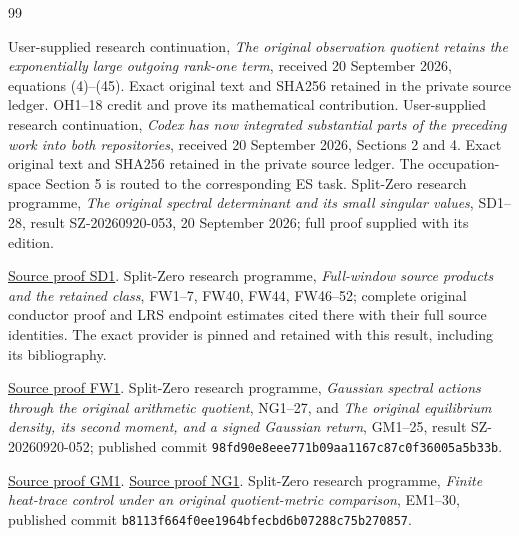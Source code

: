 \documentclass[11pt]{article}
\begin{document}
\clearpage
\begin{thebibliography}{99}

 User-supplied research continuation,
\emph{The original observation quotient retains the exponentially large
outgoing rank-one term}, received 20 September 2026, equations (4)--(45).
Exact original text and SHA256 retained in the private source ledger.
OH1--18 credit and prove its mathematical contribution.
 User-supplied research continuation,
\emph{Codex has now integrated substantial parts of the preceding work
into both repositories}, received 20 September 2026, Sections 2 and 4.
Exact original text and SHA256 retained in the private source ledger.
The occupation-space Section 5 is routed to the corresponding ES task.
 Split-Zero research programme, \emph{The original spectral
determinant and its small singular values}, SD1--28, result
SZ-20260920-053, 20 September 2026; full proof supplied with its edition.

\href{https://github.com/KokunoYumeto/zeta-function-research-reader/blob/5992ad50c0f2a06921f1fcaded7b4e38097c0739/workbenches/splitzero-tandem/continuations/20260920-original-kernel-mixed-determinants/providers/ORIGINAL_SPECTRAL_DETERMINANT.tex\#L34}{Source proof SD1}.
 Split-Zero research programme, \emph{Full-window source
products and the retained class}, FW1--7, FW40, FW44, FW46--52;
complete original conductor proof and LRS endpoint estimates cited
there with their full source identities. The exact provider is pinned
and retained with this result, including its bibliography.

\href{https://github.com/KokunoYumeto/zeta-function-research-reader/blob/5992ad50c0f2a06921f1fcaded7b4e38097c0739/workbenches/splitzero-tandem/continuations/20260920-original-kernel-mixed-determinants/providers/FULL_WINDOW_SOURCE_PRODUCTS.tex\#L28}{Source proof FW1}.
 Split-Zero research programme, \emph{Gaussian spectral
actions through the original arithmetic quotient}, NG1--27, and
\emph{The original equilibrium density, its second moment, and a signed
Gaussian return}, GM1--25, result SZ-20260920-052; published commit
\nolinkurl{98fd90e8eee771b09aa1167c87c0f36005a5b33b}.

\href{https://github.com/KokunoYumeto/zeta-function-research-reader/blob/5992ad50c0f2a06921f1fcaded7b4e38097c0739/workbenches/splitzero-tandem/continuations/20260920-original-kernel-mixed-determinants/providers/GAUSSIAN_EQUILIBRIUM_MOMENTS.tex\#L22}{Source proof GM1}. \href{https://github.com/KokunoYumeto/zeta-function-research-reader/blob/5992ad50c0f2a06921f1fcaded7b4e38097c0739/workbenches/splitzero-tandem/continuations/20260920-original-kernel-mixed-determinants/providers/GAUSSIAN_ARITHMETIC_RETURN.tex\#L31}{Source proof NG1}.
 Split-Zero research programme, \emph{Finite heat-trace
control under an original quotient-metric comparison}, EM1--30,
published commit \nolinkurl{b8113f664f0ee1964bfecbd6b07288c75b270857}.


\end{thebibliography}
\end{document}
